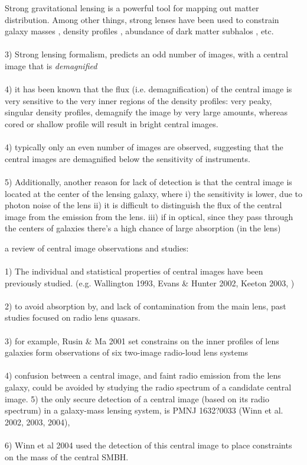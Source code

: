 \documentclass[chicago]{emulateapj}
\begin{document}
\begin{framed}
Strong gravitational lensing is a powerful tool for mapping out matter distribution. Among other things, strong lenses have been used to constrain galaxy masses  \citep[e.g.][]{}, density profiles \citep[][]{}, abundance of dark matter subhalos \citep[][]{}, etc. 
\\ \\
3) Strong lensing formalism, predicts an odd number of images, with a central image that is \emph{demagnified} \\ \\
4) it has been known that the flux (i.e. demagnification) of the central image is very sensitive to the very inner regions of the density profiles: very peaky, singular density profiles, demagnify the image by very large amounts, whereas cored or shallow profile will result in bright central images. \\ \\

4) typically only an even number of images are observed,  suggesting that the central images are demagnified below the sensitivity of instruments. \\ \\

5) Additionally, another reason for lack of detection is that the central image is located at the center of the lensing galaxy, where i) the sensitivity is lower, due to photon noise of the lens ii) it is difficult to distinguish the flux of the central image from the emission from the lens. iii) if in optical, since they pass through the centers of galaxies there's a high chance of large absorption (in the lens)
\end{framed}


\begin{framed}
a review of central image observations and studies:\\ \\

1) The individual and statistical properties of central images have been previously studied. (e.g. Wallington 1993, Evans \& Hunter 2002, Keeton 2003, ) \\ \\
2) to avoid absorption by, and lack of contamination from the main lens, past studies focused on radio lens quasars. \\ \\
3) for example, Rusin \&  Ma 2001 set constrains on the inner profiles of lens galaxies form observations of six two-image radio-loud lens systems \\ \\
4) confusion between a central image, and faint radio emission from the lens galaxy, could be avoided by studying the radio spectrum of a candidate central image.   
5) the only secure detection of a central image (based on its radio spectrum)  in a galaxy-mass lensing system, is PMNJ 1632?0033 (Winn et al. 2002, 2003, 2004),   \\ \\
6) Winn et al 2004 used the detection of this central image to place constraints on the mass of the central SMBH.
\end{framed}
\end{document}
